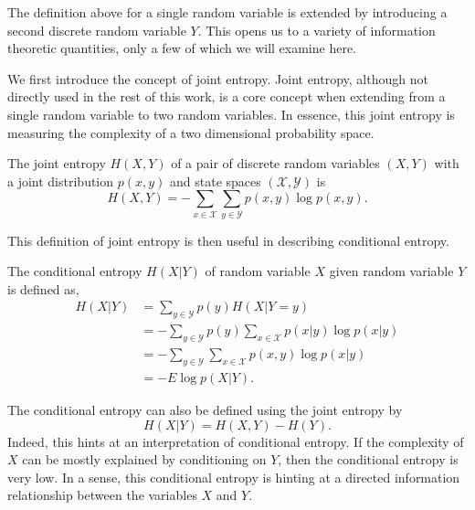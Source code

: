 The definition above for a single random variable is extended by introducing a second discrete random variable $Y$. This opens us to a variety of information theoretic quantities, only a few of which we will examine here.

We first introduce the concept of joint entropy. Joint entropy, although not directly used in the rest of this work, is a core concept when extending from a single random variable to two random variables. In essence, this joint entropy is measuring the complexity of a two dimensional probability space.

\begin{definition}
	The joint entropy $H(X,Y)$ of a pair of discrete random variables $(X,Y)$ with a joint distribution $p(x,y)$ and state spaces $(\mathcal{X}, \mathcal{Y})$ is
	\begin{equation}\label{eq:jointentropy}
	H(X, Y)=-\sum_{x \in \mathcal{X}} \sum_{y \in \mathcal{Y}} p(x, y) \log p(x, y).
	\end{equation}
\end{definition}

This definition of joint entropy is then useful in describing conditional entropy.

\begin{definition}
	The conditional entropy $H(X|Y)$ of random variable $X$ given random variable $Y$ is defined as, 
		\begin{align}
		H(X | Y)&=\sum_{y \in \mathcal{Y}} p(y) H(X |Y=y) \\
		&=-\sum_{y \in \mathcal{Y}} p(y) \sum_{x \in \mathcal{X}} p(x | y) \log p(x | y) \nonumber \\ 
		&=-\sum_{y \in \mathcal{Y}} \sum_{x \in \mathcal{X}} p(x, y) \log p(x | y) \nonumber \\ 
		&=-E \log p(X | Y).
		\end{align}
\end{definition}

The conditional entropy can also be defined using the joint entropy by
\begin{equation}
H(X|Y) = H(X,Y) - H(Y).
\end{equation}
Indeed, this hints at an interpretation of conditional entropy. If the complexity of $X$ can be mostly explained by conditioning on $Y$, then the conditional entropy is very low. In a sense, this conditional entropy is hinting at a directed information relationship between the variables $X$ and $Y.$ 


